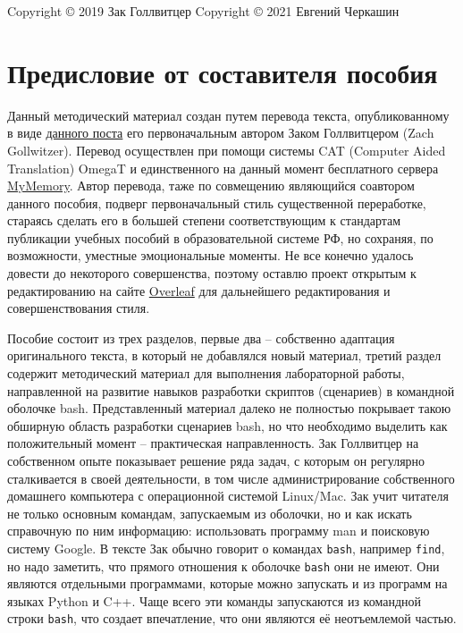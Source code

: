 \documentclass[12pt]{article}
\begin{document}
Copyright © 2019 Зак Голлвитцер
Copyright © 2021 Евгений Черкашин

\clearpage

\setcounter{tocdepth}{3}
\tableofcontents

\clearpage

\section*{Предисловие от составителя пособия}

Данный методический материал создан путем перевода текста, опубликованному в виде \href{https://zachgoll.github.io/blog/2019/bash-essentials/}{данного поста} его первоначальным автором Заком Голлвитцером (Zach Gollwitzer). Перевод осуществлен при помощи системы CAT (Computer Aided Translation) OmegaT и единственного на данный момент бесплатного сервера \href{https://mymemory.translated.net/}{MyMemory}. Автор перевода, таже по совмещению являющийся соавтором данного пособия, подверг первоначальный стиль существенной переработке, стараясь сделать его в большей степени соответствующим к стандартам публикации учебных пособий в образовательной системе РФ, но сохраняя, по возможности, уместные эмоциональные моменты. Не все конечно удалось довести до некоторого совершенства, поэтому оставлю проект открытым к редактированию на сайте \href{https://www.overleaf.com/project/602cc04c00be7fbbe118f862}{Overleaf} для дальнейшего редактирования и совершенствования стиля.

Пособие состоит из трех разделов, первые два -- собственно адаптация оригинального текста, в который не добавлялся новый материал, третий раздел содержит методический материал для выполнения лабораторной работы, направленной на развитие навыков разработки скриптов (сценариев) в командной оболочке bash. Представленный материал далеко не полностью покрывает такою обширную область разработки сценариев bash, но что необходимо выделить как положительный момент -- практическая направленность. Зак Голлвитцер на собственном опыте показывает решение ряда задач, с которым он регулярно сталкивается в своей деятельности, в том числе администрирование собственного домашнего компьютера с операционной системой Linux/Mac. Зак учит читателя не только основным командам, запускаемым из оболочки, но и как искать справочную по ним информацию: использовать программу man и поисковую систему Google. В тексте Зак обычно говорит о командах \texttt{bash}, например \texttt{find}, но надо заметить, что прямого отношения к оболочке \texttt{bash} они не имеют. Они являются отдельными программами, которые можно запускать и из программ на языках Python и C++.  Чаще всего эти команды запускаются из командной строки \texttt{bash}, что создает впечатление, что они являются её неотъемлемой частью.
\end{document}
